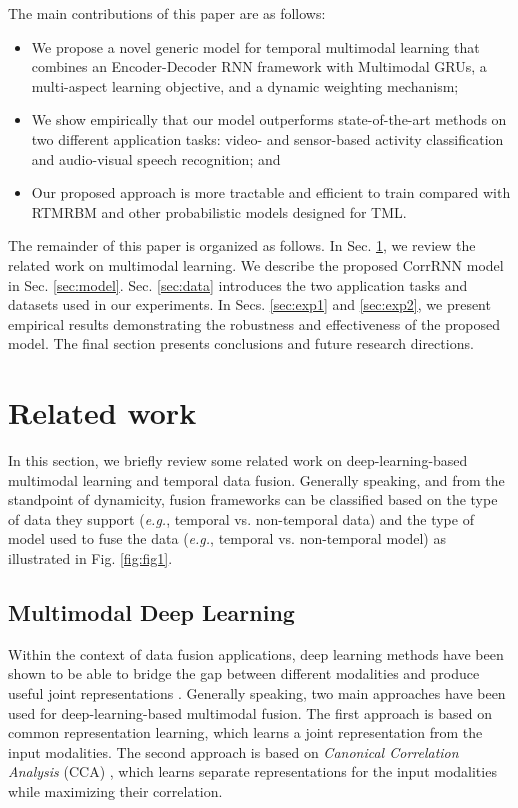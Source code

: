 \documentclass[10pt,twocolumn,letterpaper]{article}
\begin{document}
The main contributions of this paper are as follows: 
\begin{itemize}
\item We propose a novel generic model for temporal multimodal learning that combines an Encoder-Decoder RNN framework with Multimodal GRUs, a multi-aspect learning objective,  and a dynamic weighting mechanism;
\item We show empirically that our model outperforms state-of-the-art methods on two different application tasks: video- and sensor-based activity classification and audio-visual speech recognition; and  
\item Our proposed approach is more tractable and efficient to train compared with RTMRBM and other probabilistic models designed for TML.
\end{itemize}

The remainder of this paper is organized as follows. In Sec. \ref{sec:related}, we review the related work on multimodal learning. We describe the proposed CorrRNN model in Sec. \ref{sec:model}. Sec. \ref{sec:data} introduces the two application tasks and datasets used in our experiments. In Secs. \ref{sec:exp1} and \ref{sec:exp2}, we present empirical results demonstrating the robustness and effectiveness of the proposed model. The final section presents conclusions and future research directions.

\section{Related work}
\label{sec:related}
In this section, we briefly review some related work on deep-learning-based multimodal learning and temporal data fusion. Generally speaking, and from the standpoint of dynamicity, fusion frameworks can be classified based on the type of data they support (\textit{e.g.}, temporal vs. non-temporal data) and the type of model used to fuse the data (\textit{e.g.}, temporal vs. non-temporal model) as illustrated in Fig. \ref{fig:fig1}.

\subsection{Multimodal Deep Learning}
Within the context of data fusion applications, deep learning methods have been shown to be able to bridge the gap between different modalities and produce useful joint representations \cite{ngiam2011multimodal,srivastava2012multimodal}. Generally speaking, two main approaches have been used for deep-learning-based multimodal fusion. The first approach is based on common representation learning, which learns a joint representation from the input modalities. The second approach is based on \textit{Canonical Correlation Analysis} (CCA) \cite{hardoon2004canonical}, which learns separate representations for the input modalities while maximizing their correlation.
\end{document}
